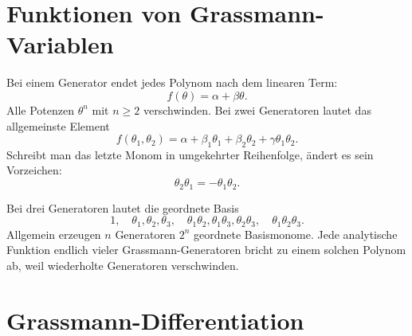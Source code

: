 \section{Funktionen von Grassmann-Variablen}

Bei einem Generator endet jedes Polynom nach dem linearen Term:
\begin{equation}
f(\theta)=\alpha+\beta\theta.
\end{equation}
Alle Potenzen \(\theta^n\) mit \(n\geq2\) verschwinden. Bei zwei Generatoren lautet das allgemeinste Element
\begin{equation}
f(\theta_1,\theta_2)
=\alpha+\beta_1\theta_1+\beta_2\theta_2
+\gamma\theta_1\theta_2.
\end{equation}
Schreibt man das letzte Monom in umgekehrter Reihenfolge, ändert es sein Vorzeichen:
\begin{equation}
\theta_2\theta_1=-\theta_1\theta_2.
\end{equation}

\begin{classroomqa}
\end{classroomqa}

Bei drei Generatoren lautet die geordnete Basis
\begin{equation}
1,\quad
\theta_1,\theta_2,\theta_3,\quad
\theta_1\theta_2,\theta_1\theta_3,\theta_2\theta_3,\quad
\theta_1\theta_2\theta_3.
\end{equation}
Allgemein erzeugen \(n\) Generatoren \(2^n\) geordnete Basismonome. Jede analytische Funktion endlich vieler Grassmann-Generatoren bricht zu einem solchen Polynom ab, weil wiederholte Generatoren verschwinden. 

\section{Grassmann-Differentiation}

